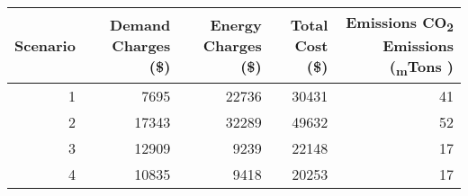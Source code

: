 \begin{tabular}{rrrrr}
\toprule
 Scenario &  Demand Charges (\$) &  Energy Charges (\$) &  Total Cost (\$) &  Emissions CO\textsubscript{2} Emissions (\textsubscript{m}Tons )\\
\midrule
        1 &                7695 &               22736 &           30431 &         41 \\
        2 &               17343 &               32289 &           49632 &        52 \\
        3 &               12909 &                9239 &           22148 &         17 \\
        4 &               10835 &                9418 &           20253 &         17\\
\bottomrule
\end{tabular}
